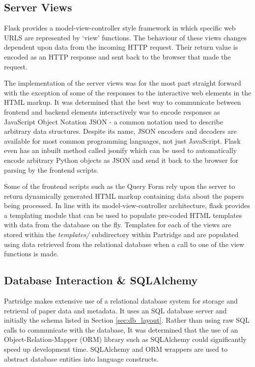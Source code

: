 \subsection{ Server Views }

Flask provides a model-view-controller style framework in which specific web
URLS are represented by `view' functions. The behaviour of these views changes
dependent upon data from the incoming HTTP request. Their return value is
encoded as an HTTP response and sent back to the browser that made the request.

The implementation of the server views was for the most part straight forward
with the exception of some of the responses to the interactive web elements in
the HTML markup. It was determined that the best way to communicate between
frontend and backend elements interactively was to encode responses as
JavaScript Object Notation JSON - a common notation used to describe arbitrary
data structures\cite{jsonRFC}. Despite its name, JSON encoders and decoders are
available for most common programming languages, not just JavaScript.  Flask
even has an inbuilt method called jsonify which can be used to automatically
encode arbitrary Python objects as JSON and send it back to the browser for
parsing by the frontend scripts\cite{flask2012}.

Some of the frontend scripts such as the Query Form rely upon the server to
return dynamically generated HTML markup containing data about the papers being
processed. In line with its model-view-controller architecture, flask provides
a templating module that can be used to populate pre-coded HTML templates with
data from the database on the fly. Templates for each of the views are stored
within the \emph{templates/} subdirectory within Partridge and are populated
using data retrieved from the relational database when a call to one of the
view functions is made\cite{flask2012}.

\subsection{Database Interaction \& SQLAlchemy}
\label{sec:dbandsqlalchemy}

Partridge makes extensive use of a relational database system for storage and
retrieval of paper data and metadata. It uses an SQL database server and
initially the schema listed in Section \ref{sec:db_layout}. Rather than using
raw SQL calls to communicate with the database, It was determined that the use
of an Object-Relation-Mapper (ORM) library such as SQLAlchemy could
significantly speed up development time. SQLAlchemy and ORM wrappers are used
to abstract database entities into language constructs. 

